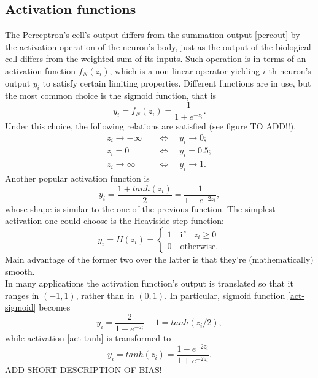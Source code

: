 \documentclass[%
    corpo=11pt,
    twoside,
    stile=classica,
    oldstyle,
    autoretitolo,
    tipotesi=magistrale,
    greek,
    evenboxes,
    english
]{toptesi}
\begin{document}
\subsection{Activation functions}
\label{percact}
The Perceptron's cell's output differs from the summation output \ref{percout} by the activation operation of the neuron's body, just as the output of the biological cell differs from the weighted sum of its inputs. Such operation is in terms of an activation function $f_N(z_i)$, which is a non-linear operator yielding $i$-th neuron's output $y_i$ to satisfy certain limiting properties. Different functions are in use, but the most common choice is the sigmoid function, that is
\begin{equation}
\label{act-sigmoid}
y_i = f_N(z_i) = \frac{1}{1 + e^{-z_i}}.
\end{equation}
Under this choice, the following relations are satisfied (see figure TO ADD!!).
\begin{align*}
z_i \to - \infty \quad &\Longleftrightarrow \quad y_i \to 0 ;\\
z_i = 0 \quad &\Longleftrightarrow \quad y_i = 0.5; \\
z_i \to  \infty \quad &\Longleftrightarrow \quad y_i \to 1.
\end{align*}
Another popular activation function is
\begin{equation}
\label{act-tanh}
y_i = \frac{1 + tanh(z_i)}{2} = \frac{1}{1 - e^{-2z_i}},
\end{equation}
whose shape is similar to the one of the previous function. The simplest activation one could choose is the Heaviside step function:
\begin{equation*}
y_i = H(z_i) = \begin{cases}
1 \quad \text{if} \quad z_i \geq 0 \\
0 \quad \text{otherwise.}
\end{cases}
\end{equation*}
Main advantage of the former two over the latter is that they're (mathematically) smooth. \\
In many applications the activation function's output is translated so that it ranges in $\left(-1, 1\right)$, rather than in $\left(0, 1 \right)$. In particular, sigmoid function \ref{act-sigmoid} becomes 
\begin{equation}
y_i = \frac{2}{1 + e^{-z_i}} -1 = tanh(z_i/2),
\end{equation}
while activation \ref{act-tanh} is transformed to 
\begin{equation}
y_i = tanh(z_i) = \frac{1 - e^{-2z_i}}{1 + e^{-2z_i}}.
\end{equation}
ADD SHORT DESCRIPTION OF BIAS!
\end{document}
